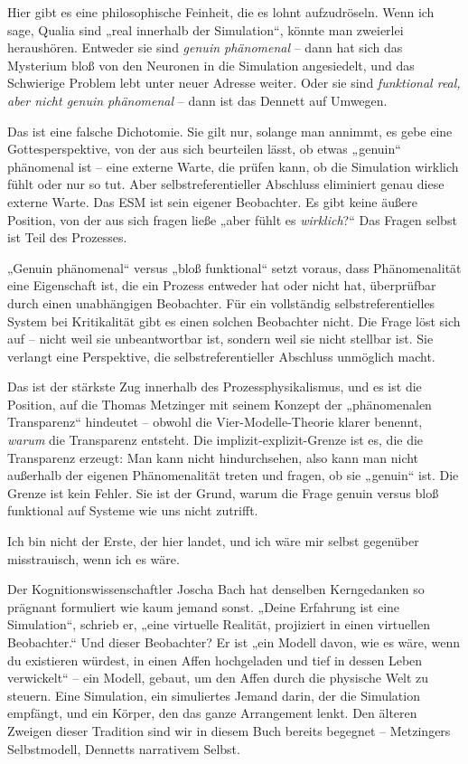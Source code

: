 \documentclass[11pt, twoside, openright]{book}
\begin{document}
Hier gibt es eine philosophische Feinheit, die es lohnt aufzudröseln. Wenn ich sage, Qualia sind „real innerhalb der Simulation“, könnte man zweierlei heraushören. Entweder sie sind \textit{genuin phänomenal} -- dann hat sich das Mysterium bloß von den Neuronen in die Simulation angesiedelt, und das Schwierige Problem lebt unter neuer Adresse weiter. Oder sie sind \textit{funktional real, aber nicht genuin phänomenal} -- dann ist das Dennett auf Umwegen.

Das ist eine falsche Dichotomie. Sie gilt nur, solange man annimmt, es gebe eine Gottesperspektive, von der aus sich beurteilen lässt, ob etwas „genuin“ phänomenal ist -- eine externe Warte, die prüfen kann, ob die Simulation wirklich fühlt oder nur so tut. Aber selbstreferentieller Abschluss eliminiert genau diese externe Warte. Das ESM ist sein eigener Beobachter. Es gibt keine äußere Position, von der aus sich fragen ließe „aber fühlt es \textit{wirklich}?“ Das Fragen selbst ist Teil des Prozesses.

„Genuin phänomenal“ versus „bloß funktional“ setzt voraus, dass Phänomenalität eine Eigenschaft ist, die ein Prozess entweder hat oder nicht hat, überprüfbar durch einen unabhängigen Beobachter. Für ein vollständig selbstreferentielles System bei Kritikalität gibt es einen solchen Beobachter nicht. Die Frage löst sich auf -- nicht weil sie unbeantwortbar ist, sondern weil sie nicht stellbar ist. Sie verlangt eine Perspektive, die selbstreferentieller Abschluss unmöglich macht.

Das ist der stärkste Zug innerhalb des Prozessphysikalismus, und es ist die Position, auf die Thomas Metzinger mit seinem Konzept der „phänomenalen Transparenz“ hindeutet -- obwohl die Vier-Modelle-Theorie klarer benennt, \textit{warum} die Transparenz entsteht. Die implizit-explizit-Grenze ist es, die die Transparenz erzeugt: Man kann nicht hindurchsehen, also kann man nicht außerhalb der eigenen Phänomenalität treten und fragen, ob sie „genuin“ ist. Die Grenze ist kein Fehler. Sie ist der Grund, warum die Frage genuin versus bloß funktional auf Systeme wie uns nicht zutrifft.

Ich bin nicht der Erste, der hier landet, und ich wäre mir selbst gegenüber misstrauisch, wenn ich es wäre.

Der Kognitionswissenschaftler Joscha Bach hat denselben Kerngedanken so prägnant formuliert wie kaum jemand sonst. „Deine Erfahrung ist eine Simulation“, schrieb er, „eine virtuelle Realität, projiziert in einen virtuellen Beobachter.“ Und dieser Beobachter? Er ist „ein Modell davon, wie es wäre, wenn du existieren würdest, in einen Affen hochgeladen und tief in dessen Leben verwickelt“ -- ein Modell, gebaut, um den Affen durch die physische Welt zu steuern. Eine Simulation, ein simuliertes Jemand darin, der die Simulation empfängt, und ein Körper, den das ganze Arrangement lenkt. Den älteren Zweigen dieser Tradition sind wir in diesem Buch bereits begegnet -- Metzingers Selbstmodell, Dennetts narrativem Selbst.
\end{document}
